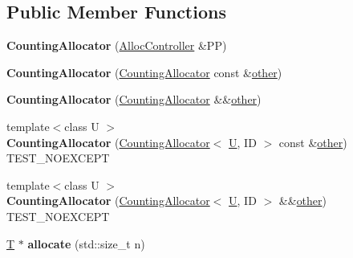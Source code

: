 \subsection*{Public Member Functions}
\begin{DoxyCompactItemize}
\item 
\mbox{\label{class_counting_allocator_aa8916b53d1c60b8a6c4305409e1fb7de}} 
{\bfseries Counting\+Allocator} (\mbox{\hyperlink{struct_alloc_controller}{Alloc\+Controller}} \&PP)
\item 
\mbox{\label{class_counting_allocator_aad6b6d5e6555dfc266c35e4820973cf1}} 
{\bfseries Counting\+Allocator} (\mbox{\hyperlink{class_counting_allocator}{Counting\+Allocator}} const \&\mbox{\hyperlink{structother}{other}})
\item 
\mbox{\label{class_counting_allocator_ae850714d6d324a62a728f7240429cc9d}} 
{\bfseries Counting\+Allocator} (\mbox{\hyperlink{class_counting_allocator}{Counting\+Allocator}} \&\&\mbox{\hyperlink{structother}{other}})
\item 
\mbox{\label{class_counting_allocator_ab5b47db43663c8d9064cab93126d46ef}} 
{\footnotesize template$<$class U $>$ }\\{\bfseries Counting\+Allocator} (\mbox{\hyperlink{class_counting_allocator}{Counting\+Allocator}}$<$ \mbox{\hyperlink{union_u}{U}}, ID $>$ const \&\mbox{\hyperlink{structother}{other}}) T\+E\+S\+T\+\_\+\+N\+O\+E\+X\+C\+E\+PT
\item 
\mbox{\label{class_counting_allocator_af84b8afc66fcc93e9f151e78da8a4cee}} 
{\footnotesize template$<$class U $>$ }\\{\bfseries Counting\+Allocator} (\mbox{\hyperlink{class_counting_allocator}{Counting\+Allocator}}$<$ \mbox{\hyperlink{union_u}{U}}, ID $>$ \&\&\mbox{\hyperlink{structother}{other}}) T\+E\+S\+T\+\_\+\+N\+O\+E\+X\+C\+E\+PT
\item 
\mbox{\label{class_counting_allocator_a908b101454464662b4cf8df4a36e365a}} 
\mbox{\hyperlink{struct_t}{T}} $\ast$ {\bfseries allocate} (std\+::size\+\_\+t n)
\item 
\mbox{\label{class_counting_allocator_a475213747f7bf4948b05a83a9b87b03e}} 

\end{DoxyCompactItemize}
